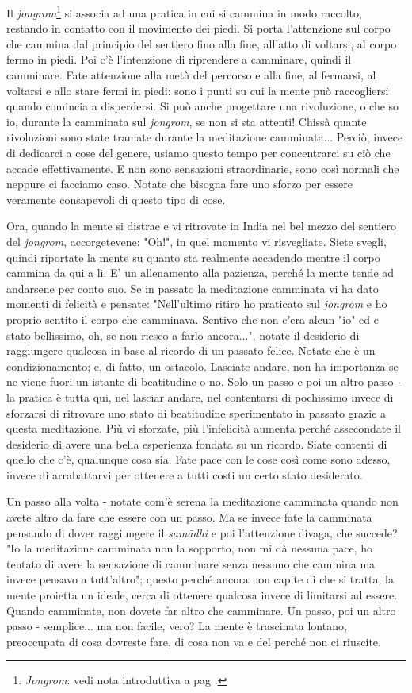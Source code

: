 
Il \textit{jongrom}\footnote{\textit{Jongrom}: vedi nota introduttiva a pag \pageref{jongrom}.} si associa ad una pratica in cui si cammina in
modo raccolto, restando in contatto con il movimento dei piedi. Si porta
l'attenzione sul corpo che cammina dal principio del sentiero fino alla
fine, all'atto di voltarsi, al corpo fermo in piedi. Poi c'è
l'intenzione di riprendere a camminare, quindi il camminare. Fate
attenzione alla metà del percorso e alla fine, al fermarsi, al voltarsi
e allo stare fermi in piedi: sono i punti su cui la mente può
raccogliersi quando comincia a disperdersi. Si può anche progettare una
rivoluzione, o che so io, durante la camminata sul \textit{jongrom}, se non si
sta attenti! Chissà quante rivoluzioni sono state tramate durante la
meditazione camminata... Perciò, invece di dedicarci a cose del genere,
usiamo questo tempo per concentrarci su ciò che accade effettivamente. E
non sono sensazioni straordinarie, sono così normali che neppure ci
facciamo caso. Notate che bisogna fare uno sforzo per essere veramente
consapevoli di questo tipo di cose.

Ora, quando la mente si distrae e vi ritrovate in India nel bel mezzo
del sentiero del \textit{jongrom}, accorgetevene: "Oh!", in quel momento vi
risvegliate. Siete svegli, quindi riportate la mente su quanto sta
realmente accadendo mentre il corpo cammina da qui a lì. E' un
allenamento alla pazienza, perché la mente tende ad andarsene per conto
suo. Se in passato la meditazione camminata vi ha dato momenti di
felicità e pensate: "Nell'ultimo ritiro ho praticato sul \textit{jongrom} e ho
proprio sentito il corpo che camminava. Sentivo che non c'era alcun "io"
ed e stato bellissimo, oh, se non riesco a farlo ancora...", notate il
desiderio di raggiungere qualcosa in base al ricordo di un passato
felice. Notate che è un condizionamento; e, di fatto, un ostacolo.
Lasciate andare, non ha importanza se ne viene fuori un istante di
beatitudine o no. Solo un passo e poi un altro passo - la pratica è
tutta qui, nel lasciar andare, nel contentarsi di pochissimo invece di
sforzarsi di ritrovare uno stato di beatitudine sperimentato in passato
grazie a questa meditazione. Più vi sforzate, più l'infelicità aumenta
perché assecondate il desiderio di avere una bella esperienza fondata su
un ricordo. Siate contenti di quello che c'è, qualunque cosa sia. Fate
pace con le cose così come sono adesso, invece di arrabattarvi per
ottenere a tutti costi un certo stato desiderato.

Un passo alla volta - notate com'è serena la meditazione camminata
quando non avete altro da fare che essere con un passo. Ma se invece
fate la camminata pensando di dover raggiungere il \textit{samādhi} e poi
l'attenzione divaga, che succede? "Io la meditazione camminata non la
sopporto, non mi dà nessuna pace, ho tentato di avere la sensazione di
camminare senza nessuno che cammina ma invece pensavo a tutt'altro";
questo perché ancora non capite di che si tratta, la mente proietta un
ideale, cerca di ottenere qualcosa invece di limitarsi ad essere. Quando
camminate, non dovete far altro che camminare. Un passo, poi un altro
passo - semplice... ma non facile, vero? La mente è trascinata lontano,
preoccupata di cosa dovreste fare, di cosa non va e del perché non ci
riuscite.


